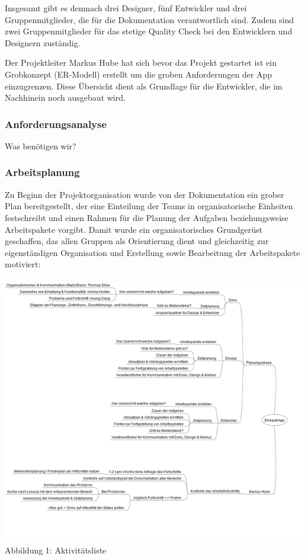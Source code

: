 \documentclass[12pt,a4paper]{article}
\begin{document}
Insgesamt gibt es demnach drei Designer, fünf Entwickler und drei Gruppenmitglieder, die für die Dokumentation verantwortlich sind. Zudem sind zwei Gruppenmitglieder für das stetige Quality Check bei den Entwicklern und Designern zuständig.

Der Projektleiter Markus Hube hat sich bevor das Projekt gestartet ist ein Grobkonzept (ER-Modell) erstellt um die groben Anforderungen der App einzugrenzen. Diese Übersicht dient als Grundlage für die Entwickler, die im Nachhinein noch ausgebaut wird.
\newpage

\subsubsection{Anforderungsanalyse}
Was benötigen wir? 
\newpage

\subsubsection{Arbeitsplanung}
Zu Beginn der Projektorganisation wurde von der Dokumentation ein grober Plan bereitgestellt, der eine Einteilung der Teams in organisatorische Einheiten festschreibt und einen Rahmen für die Planung der Aufgaben beziehungsweise Arbeitspakete vorgibt. Damit wurde ein organisatorisches Grundgerüst geschaffen, das allen Gruppen als Orientierung dient und gleichzeitig zur eigenständigen Organisation und Erstellung sowie Bearbeitung der Arbeitspakete motiviert:
\\
\\
\includegraphics[scale=0.6, origin=l]{Aktivitaetsliste.png}
\\
\footnotesize Abbildung 1: Aktivitätsliste
\normalsize
\\
\linebreak
\end{document}
